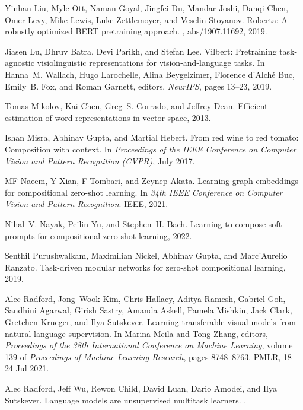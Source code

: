 \documentclass[10pt,twocolumn,letterpaper]{article}
\begin{document}
{\begin{thebibliography}{10}
Yinhan Liu, Myle Ott, Naman Goyal, Jingfei Du, Mandar Joshi, Danqi Chen, Omer
  Levy, Mike Lewis, Luke Zettlemoyer, and Veselin Stoyanov.
\newblock Roberta: {A} robustly optimized {BERT} pretraining approach.
, abs/1907.11692, 2019.

Jiasen Lu, Dhruv Batra, Devi Parikh, and Stefan Lee.
\newblock Vilbert: Pretraining task-agnostic visiolinguistic representations
  for vision-and-language tasks.
\newblock In Hanna~M. Wallach, Hugo Larochelle, Alina Beygelzimer, Florence
  d'Alché Buc, Emily~B. Fox, and Roman Garnett, editors, {\em NeurIPS}, pages
  13--23, 2019.

Tomas Mikolov, Kai Chen, Greg~S. Corrado, and Jeffrey Dean.
\newblock Efficient estimation of word representations in vector space, 2013.

Ishan Misra, Abhinav Gupta, and Martial Hebert.
\newblock From red wine to red tomato: Composition with context.
\newblock In {\em Proceedings of the IEEE Conference on Computer Vision and
  Pattern Recognition (CVPR)}, July 2017.

MF Naeem, Y Xian, F Tombari, and Zeynep Akata.
\newblock Learning graph embeddings for compositional zero-shot learning.
\newblock In {\em 34th IEEE Conference on Computer Vision and Pattern
  Recognition}. IEEE, 2021.

Nihal~V. Nayak, Peilin Yu, and Stephen~H. Bach.
\newblock Learning to compose soft prompts for compositional zero-shot
  learning, 2022.

Senthil Purushwalkam, Maximilian Nickel, Abhinav Gupta, and Marc'Aurelio
  Ranzato.
\newblock Task-driven modular networks for zero-shot compositional learning,
  2019.

Alec Radford, Jong~Wook Kim, Chris Hallacy, Aditya Ramesh, Gabriel Goh,
  Sandhini Agarwal, Girish Sastry, Amanda Askell, Pamela Mishkin, Jack Clark,
  Gretchen Krueger, and Ilya Sutskever.
\newblock Learning transferable visual models from natural language
  supervision.
\newblock In Marina Meila and Tong Zhang, editors, {\em Proceedings of the 38th
  International Conference on Machine Learning}, volume 139 of {\em Proceedings
  of Machine Learning Research}, pages 8748--8763. PMLR, 18--24 Jul 2021.

Alec Radford, Jeff Wu, Rewon Child, David Luan, Dario Amodei, and Ilya
  Sutskever.
\newblock Language models are unsupervised multitask learners.
.


\end{thebibliography}}
\end{document}

